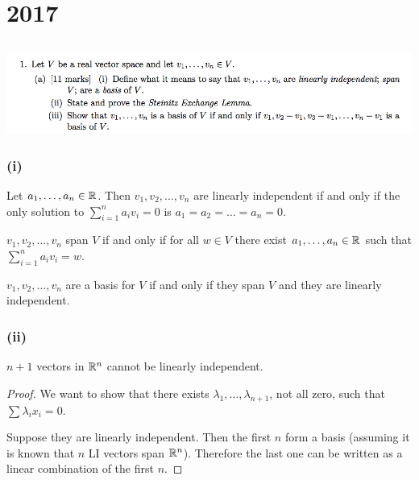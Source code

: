 \documentclass[12pt]{article}
\begin{document}
\section{2017}

\subsection*{}  %
\begin{mdframed}
\includegraphics[width=400pt]{img/oxford-prelims-2017-A-1-1.png}
\end{mdframed}

\subsubsection*{(i)}
\begin{definition*}
  Let $a_1, \ldots, a_n \in \mathbb{R}$. Then $v_1, v_2, \ldots, v_n$ are linearly
  independent if and only if the only solution to $\sum_{i=1}^n a_iv_i = 0$ is
  $a_1 = a_2 = \ldots = a_n = 0$.
\end{definition*}

\begin{definition*}[Span]
  $v_1, v_2, \ldots, v_n$ span $V$ if and only if for all $w \in V$ there exist
  $a_1, \ldots, a_n \in \mathbb{R}$ such that $\sum_{i=1}^n a_iv_i = w$.
\end{definition*}

\begin{definition*}[Basis]
  $v_1, v_2, \ldots, v_n$ are a basis for $V$ if and only if they span $V$ and
  they are linearly independent.
\end{definition*}


\newpage
\subsubsection*{(ii)}

\begin{claim*}
  $n+1$ vectors in $\mathbb{R}^n$ cannot be linearly independent.
\end{claim*}

\begin{proof}
  We want to show that there exists $\lambda_1, \ldots, \lambda_{n+1}$, not all
  zero, such that $\sum \lambda_ix_i = 0$.

  Suppose they are linearly independent. Then the first $n$ form a basis
  (assuming it is known that $n$ LI vectors span $\mathbb{R}^n$). Therefore the last
  one can be written as a linear combination of the first $n$.
\end{proof}
\end{document}
